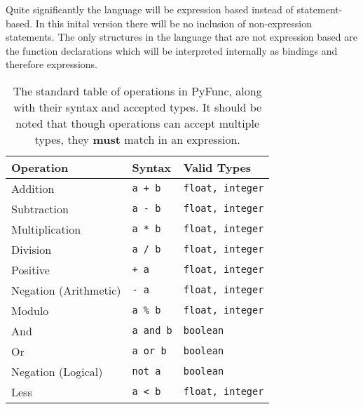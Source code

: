 \documentclass{l4proj}
\begin{document}
Quite significantly the language will be expression based instead of statement-based.
In this inital version there will be no inclusion of non-expression statements.
The only structures in the language that are not expression based are the function declarations which will be interpreted internally as bindings and therefore expressions.



\begin{table}[h!]
    \caption{The standard table of operations in PyFunc, along with their syntax and accepted types. It should be noted that though operations can accept multiple types, they \textbf{must} match in an expression.}\label{tab:operators}
    \begin{center}
    \begin{tabular}{@{}|l|l|l|@{}}
    \hline
    \textbf{Operation}    & \textbf{Syntax}       &   \textbf{Valid Types}    \\ %
    \hline
    Addition              & \texttt{a + b}        &   \texttt{float, integer} \\
    Subtraction           & \texttt{a - b}        &   \texttt{float, integer} \\
    Multiplication        & \texttt{a * b}        &   \texttt{float, integer} \\
    Division              & \texttt{a / b}        &   \texttt{float, integer} \\
    Positive              & \texttt{+ a}          &   \texttt{float, integer} \\
    Negation (Arithmetic) & \texttt{- a}          &   \texttt{float, integer} \\
    Modulo                & \texttt{a \% b}       &   \texttt{float, integer} \\
    And                   & \texttt{a and b}      &   \texttt{boolean}        \\
    Or                    & \texttt{a or b}       &   \texttt{boolean}        \\
    Negation (Logical)    & \texttt{not a}        &   \texttt{boolean}        \\
    Less                  & \texttt{a < b}        &   \texttt{float, integer} \\

\end{tabular}
\end{center}
\end{table}
\end{document}
